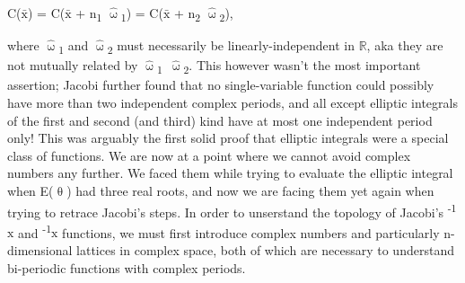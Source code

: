 \documentclass[a4paper,10pt]{article}
\begin{document}
\begin{flushleft}
{{  \vspace{2mm}
  \begin{center}
    C($\bar{\text{x}}$) = C($\bar{\text{x}}$ + n\textsubscript{1}\,\cdot\,$\hat{\upomega}$\textsubscript{1}) = C($\bar{\text{x}}$ + n\textsubscript{2}\,\cdot\,$\hat{\upomega}$\textsubscript{2}),
  \end{center}
  \begin{flushright}
    {\vspace{-7mm}}
  \end{flushright}
  \vspace{2mm}
  where $\hat{\upomega}$\textsubscript{1} and $\hat{\upomega}$\textsubscript{2} must necessarily be linearly-independent in {$\mathbb{R}$}, aka they are not mutually related by $\hat{\upomega}$\textsubscript{1}\,{}\,\cdot\,$\hat{\upomega}$\textsubscript{2}. This however wasn't the most important assertion; Jacobi further found that no single-variable function could possibly have more than two independent complex periods, and all except elliptic integrals of the first and second (and third) kind have at most one independent period only! This was arguably the first solid proof that elliptic integrals were a special class of functions.\linebreak\linebreak\linebreak
  \textbf{\Large\pbold{}}\linebreak\linebreak
  We are now at a point where we cannot avoid complex numbers any further. We faced them while trying to evaluate the elliptic integral when {E($\uptheta$)} had three real roots, and now we are facing them yet again when trying to retrace Jacobi's steps. In order to unserstand the topology of Jacobi's \textsuperscript{-1}${\text{x}}$ and \textsuperscript{-1}${\text{x}}$ functions, we must first introduce complex numbers and particularly n-dimensional lattices in complex space, both of which are necessary to understand bi-periodic functions with complex periods.\linebreak\linebreak
}}
\end{flushleft}
\end{document}
